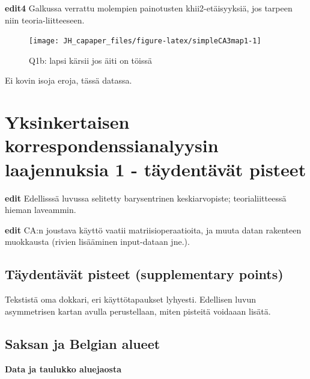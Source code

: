 \documentclass[
  finnish,
]{book}
\begin{document}
\textbf{edit4} Galkussa verrattu molempien painotusten
khii2-etäisyyksiä, jos tarpeen niin teoria-liitteeseen.

\begin{figure}

{\centering \texttt{[image: JH\_capaper\_files/figure-latex/simpleCA3map1-1]} 

}

\caption{Q1b: lapsi kärsii jos äiti on töissä}\label{fig:simpleCA3map1}
\end{figure}

Ei kovin isoja eroja, tässä datassa.

\hypertarget{yksinkertaisen-korrespondenssianalyysin-laajennuksia-1---tuxe4ydentuxe4vuxe4t-pisteet}{%
\chapter{Yksinkertaisen korrespondenssianalyysin laajennuksia 1 -
täydentävät
pisteet}\label{yksinkertaisen-korrespondenssianalyysin-laajennuksia-1---tuxe4ydentuxe4vuxe4t-pisteet}}

\textbf{edit} Edellisssä luvussa selitetty barysentrinen keskiarvopiste;
teorialiitteessä hieman laveammin.

\textbf{edit} CA:n joustava käyttö vaatii matriisioperaatioita, ja muuta
datan rakenteen muokkausta (rivien lisääminen input-dataan jne.).

\hypertarget{tuxe4ydentuxe4vuxe4t-pisteet-supplementary-points}{%
\section{Täydentävät pisteet (supplementary
points)}\label{tuxe4ydentuxe4vuxe4t-pisteet-supplementary-points}}

Tekstistä oma dokkari, eri käyttötapaukset lyhyesti. Edellisen luvun
asymmetrisen kartan avulla perustellaan, miten pisteitä voidaaan lisätä.

\hypertarget{saksan-ja-belgian-alueet}{%
\section{Saksan ja Belgian alueet}\label{saksan-ja-belgian-alueet}}

\textbf{Data ja taulukko aluejaosta}
\end{document}
